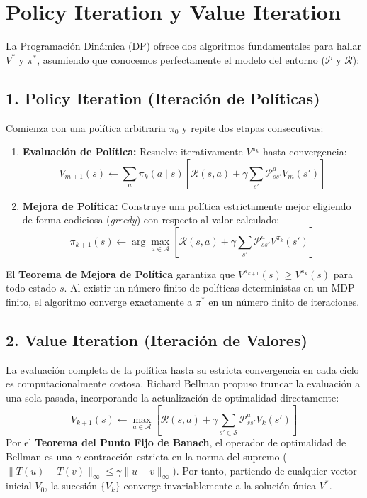 \section{Policy Iteration y Value Iteration}
La Programación Dinámica (DP) ofrece dos algoritmos fundamentales para hallar $V^*$ y $\pi^*$, asumiendo que conocemos perfectamente el modelo del entorno ($\mathcal{P}$ y $\mathcal{R}$):

\subsection{1. Policy Iteration (Iteración de Políticas)}
Comienza con una política arbitraria $\pi_0$ y repite dos etapas consecutivas:
\begin{enumerate}
  \item \textbf{Evaluación de Política:} Resuelve iterativamente $V^{\pi_k}$ hasta convergencia:
  \[
    V_{m+1}(s) \leftarrow \sum_{a} \pi_k(a \mid s) \left[ \mathcal{R}(s,a) + \gamma \sum_{s'} \mathcal{P}_{ss'}^a V_m(s') \right]
  \]
  \item \textbf{Mejora de Política:} Construye una política estrictamente mejor eligiendo de forma codiciosa (\textit{greedy}) con respecto al valor calculado:
  \[
    \pi_{k+1}(s) \leftarrow \arg\max_{a \in \mathcal{A}} \left[ \mathcal{R}(s,a) + \gamma \sum_{s'} \mathcal{P}_{ss'}^a V^{\pi_k}(s') \right]
  \]
\end{enumerate}
El \textbf{Teorema de Mejora de Política} garantiza que $V^{\pi_{k+1}}(s) \ge V^{\pi_k}(s)$ para todo estado $s$. Al existir un número finito de políticas deterministas en un MDP finito, el algoritmo converge exactamente a $\pi^*$ en un número finito de iteraciones.

\subsection{2. Value Iteration (Iteración de Valores)}
La evaluación completa de la política hasta su estricta convergencia en cada ciclo es computacionalmente costosa. Richard Bellman propuso truncar la evaluación a una sola pasada, incorporando la actualización de optimalidad directamente:
\begin{equation}
  V_{k+1}(s) \leftarrow \max_{a \in \mathcal{A}} \left[ \mathcal{R}(s, a) + \gamma \sum_{s' \in \mathcal{S}} \mathcal{P}_{ss'}^a V_k(s') \right]
\end{equation}
Por el \textbf{Teorema del Punto Fijo de Banach}, el operador de optimalidad de Bellman es una $\gamma$-contracción estricta en la norma del supremo ($\|T(u) - T(v)\|_\infty \le \gamma \|u - v\|_\infty$). Por tanto, partiendo de cualquier vector inicial $V_0$, la sucesión $\{V_k\}$ converge invariablemente a la solución única $V^*$.

